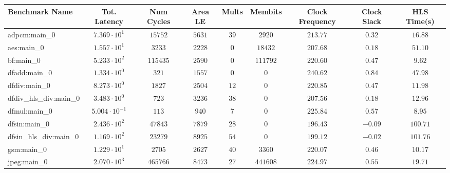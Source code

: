 \begin{tabular}{|l|c|c|c|c|c|c|c|c|}
\hline
Benchmark Name          & Tot. Latency            & Num Cycles & Area LE   & Mults   & Membits    & Clock Frequency & Clock Slack & HLS Time(s) \\
\hline
adpcm:main\_0           & $ 7.369 \cdot 10^{1}  $ & $ 15752  $ & $ 5631  $ & $ 39  $ & $ 2920   $ & $ 213.77      $ & $ 0.32    $ & $ 16.88   $ \\
aes:main\_0             & $ 1.557 \cdot 10^{1}  $ & $ 3233   $ & $ 2228  $ & $ 0   $ & $ 18432  $ & $ 207.68      $ & $ 0.18    $ & $ 51.10   $ \\
bf:main\_0              & $ 5.233 \cdot 10^{2}  $ & $ 115435 $ & $ 2590  $ & $ 0   $ & $ 111792 $ & $ 220.60      $ & $ 0.47    $ & $ 9.62    $ \\
dfadd:main\_0           & $ 1.334 \cdot 10^{0}  $ & $ 321    $ & $ 1557  $ & $ 0   $ & $ 0      $ & $ 240.62      $ & $ 0.84    $ & $ 47.98   $ \\
dfdiv:main\_0           & $ 8.273 \cdot 10^{0}  $ & $ 1827   $ & $ 2504  $ & $ 12  $ & $ 0      $ & $ 220.85      $ & $ 0.47    $ & $ 11.98   $ \\
dfdiv\_hls\_div:main\_0 & $ 3.483 \cdot 10^{0}  $ & $ 723    $ & $ 3236  $ & $ 38  $ & $ 0      $ & $ 207.56      $ & $ 0.18    $ & $ 12.96   $ \\
dfmul:main\_0           & $ 5.004 \cdot 10^{-1} $ & $ 113    $ & $ 940   $ & $ 7   $ & $ 0      $ & $ 225.84      $ & $ 0.57    $ & $ 8.95    $ \\
dfsin:main\_0           & $ 2.436 \cdot 10^{2}  $ & $ 47843  $ & $ 7879  $ & $ 28  $ & $ 0      $ & $ 196.43      $ & $ -0.09   $ & $ 100.71  $ \\
dfsin\_hls\_div:main\_0 & $ 1.169 \cdot 10^{2}  $ & $ 23279  $ & $ 8925  $ & $ 54  $ & $ 0      $ & $ 199.12      $ & $ -0.02   $ & $ 101.76  $ \\
gsm:main\_0             & $ 1.229 \cdot 10^{1}  $ & $ 2705   $ & $ 2627  $ & $ 40  $ & $ 3360   $ & $ 220.07      $ & $ 0.46    $ & $ 10.17   $ \\
jpeg:main\_0            & $ 2.070 \cdot 10^{3}  $ & $ 465766 $ & $ 8473  $ & $ 27  $ & $ 441608 $ & $ 224.97      $ & $ 0.55    $ & $ 19.71   $ \\

\end{tabular}

